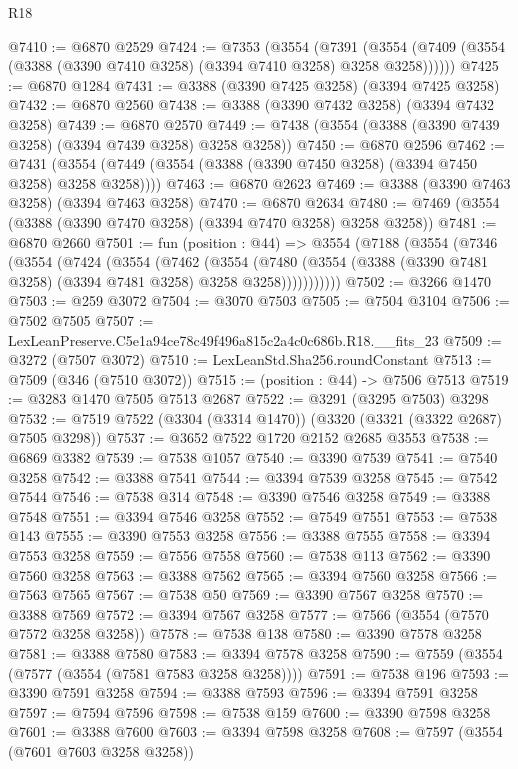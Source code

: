 \begin{lexlean}{R18}
\begin{coremodule}
@7410 := @6870 @2529
@7424 := @7353
    (@3554
      (@7391 (@3554 (@7409 (@3554 (@3388 (@3390 @7410 @3258) (@3394 @7410 @3258) @3258 @3258))))))
@7425 := @6870 @1284
@7431 := @3388 (@3390 @7425 @3258) (@3394 @7425 @3258)
@7432 := @6870 @2560
@7438 := @3388 (@3390 @7432 @3258) (@3394 @7432 @3258)
@7439 := @6870 @2570
@7449 := @7438 (@3554 (@3388 (@3390 @7439 @3258) (@3394 @7439 @3258) @3258 @3258))
@7450 := @6870 @2596
@7462 := @7431 (@3554 (@7449 (@3554 (@3388 (@3390 @7450 @3258) (@3394 @7450 @3258) @3258 @3258))))
@7463 := @6870 @2623
@7469 := @3388 (@3390 @7463 @3258) (@3394 @7463 @3258)
@7470 := @6870 @2634
@7480 := @7469 (@3554 (@3388 (@3390 @7470 @3258) (@3394 @7470 @3258) @3258 @3258))
@7481 := @6870 @2660
@7501 := fun (position : @44) =>
  @3554
    (@7188
      (@3554
        (@7346
          (@3554
            (@7424
              (@3554
                (@7462
                  (@3554
                    (@7480
                      (@3554 (@3388 (@3390 @7481 @3258) (@3394 @7481 @3258) @3258 @3258)))))))))))
@7502 := @3266 @1470
@7503 := @259 @3072
@7504 := @3070 @7503
@7505 := @7504 @3104
@7506 := @7502 @7505
@7507 := LexLeanPreserve.C5e1a94ce78c49f496a815c2a4c0c686b.R18.__fits_23
@7509 := @3272 (@7507 @3072)
@7510 := LexLeanStd.Sha256.roundConstant
@7513 := @7509 (@346 (@7510 @3072))
@7515 := (position : @44) -> @7506 @7513
@7519 := @3283 @1470 @7505 @7513 @2687
@7522 := @3291 (@3295 @7503) @3298
@7532 := @7519 @7522 (@3304 (@3314 @1470)) (@3320 (@3321 (@3322 @2687) @7505 @3298))
@7537 := @3652 @7522 @1720 @2152 @2685 @3553
@7538 := @6869 @3382
@7539 := @7538 @1057
@7540 := @3390 @7539
@7541 := @7540 @3258
@7542 := @3388 @7541
@7544 := @3394 @7539 @3258
@7545 := @7542 @7544
@7546 := @7538 @314
@7548 := @3390 @7546 @3258
@7549 := @3388 @7548
@7551 := @3394 @7546 @3258
@7552 := @7549 @7551
@7553 := @7538 @143
@7555 := @3390 @7553 @3258
@7556 := @3388 @7555
@7558 := @3394 @7553 @3258
@7559 := @7556 @7558
@7560 := @7538 @113
@7562 := @3390 @7560 @3258
@7563 := @3388 @7562
@7565 := @3394 @7560 @3258
@7566 := @7563 @7565
@7567 := @7538 @50
@7569 := @3390 @7567 @3258
@7570 := @3388 @7569
@7572 := @3394 @7567 @3258
@7577 := @7566 (@3554 (@7570 @7572 @3258 @3258))
@7578 := @7538 @138
@7580 := @3390 @7578 @3258
@7581 := @3388 @7580
@7583 := @3394 @7578 @3258
@7590 := @7559 (@3554 (@7577 (@3554 (@7581 @7583 @3258 @3258))))
@7591 := @7538 @196
@7593 := @3390 @7591 @3258
@7594 := @3388 @7593
@7596 := @3394 @7591 @3258
@7597 := @7594 @7596
@7598 := @7538 @159
@7600 := @3390 @7598 @3258
@7601 := @3388 @7600
@7603 := @3394 @7598 @3258
@7608 := @7597 (@3554 (@7601 @7603 @3258 @3258))

\end{coremodule}
\end{lexlean}
